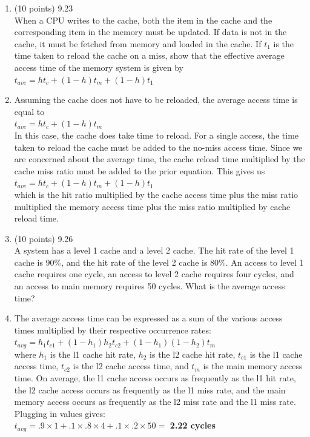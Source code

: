 \documentclass[letterpaper,10pt,onecolumn,titlepage]{article}
\begin{document}
\begin{enumerate}

\item (10 points) 9.23 \\
	When a CPU writes to the cache, both the item in the cache and the corresponding
	item in the memory must be updated. If data is not in the cache, it must be
	fetched from memory and loaded in the cache. If $t_{1}$ is the time taken to
	reload the cache on a miss, show that the effective average access time of the
	memory system is given by \\
	$t_{ave} = ht_{c} + (1-h)t_{m} + (1-h)t_{1}$

\item[\textbullet] Assuming the cache does not have to be reloaded, the average
	access time is equal to \\
	$t_{ave} = ht_{c} + (1-h)t_{m}$ \\
	In this case, the cache does take time to reload. For a single access, the time
	taken to reload the cache must be added to the no-miss access time. Since we are
	concerned about the average time, the cache reload time multiplied by the cache
	miss ratio must be added to the prior equation. This gives us \\
	$t_{ave} = ht_{c} + (1-h)t_{m} + (1-h)t_{1}$ \\
	which is the hit ratio multiplied by the cache access time plus the miss ratio
	multiplied the memory access time plus the miss ratio multiplied by cache reload
	time.

\item (10 points) 9.26 \\
	A system has a level 1 cache and a level 2 cache. The hit rate of the
	level 1 cache is 90\%, and the hit rate of the level 2 cache is 80\%. An access to
	level 1 cache requires one cycle, an access to level 2 cache requires four cycles,
	and an access to main memory requires 50 cycles. What is the average access time?
\item[\textbullet] The average access time can be expressed as a sum of the various access
	times multiplied by their respective occurrence rates: \\
	$t_{avg}=h_{1}t_{c1}+(1-h_{1})h_{2}t_{c2}+(1-h_{1})(1-h_{2})t_{m}$ \\
	where $h_{1}$ is the l1 cache hit rate, $h_{2}$ is the l2 cache hit rate, $t_{c1}$
	is the l1 cache access time, $t_{c2}$ is the l2 cache access time, and $t_{m}$ is
	the main memory access time. On average, the l1 cache access occurs as
	frequently as the l1 hit rate, the l2 cache access occurs as frequently as
	the l1 miss rate, and the main memory access occurs as frequently as the l2 miss
	rate and the l1 miss rate. Plugging in values gives: \\
	$t_{avg}=.9\times1+.1\times.8\times4+.1\times.2\times50=$ \textbf{2.22 cycles}


\end{enumerate}
\end{document}
